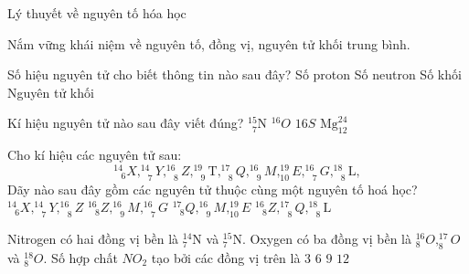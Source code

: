 \begin{dang}{Lý thuyết về nguyên tố hóa học}\end{dang}
\begin{pp}
	Nắm vững khái niệm về nguyên tố, đồng vị, nguyên tử khối trung bình.
\end{pp}
\begin{vdex}
	Số hiệu nguyên tử cho biết thông tin nào sau đây?
	\choice
	{\True Số proton}
	{Số neutron}
	{Số khối}
	{Nguyên tử khối}
\end{vdex}
\begin{vdex}
	Kí hiệu nguyên tử nào sau đây viết đúng?
	\choice
	{\True $_{\phantom{7}7}^{15}\mathrm{N}$}
	{$^{16}O$}
	{$16S$}
	{$\mathrm{Mg}_{12}^{24}$}
\end{vdex}
\begin{vdex}
	Cho kí hiệu các nguyên tử sau:
	$$
	_{\phantom{X}6}^{14}X,_{\phantom{X}7}^{14} Y,_{\phantom{X}8}^{16}Z,_{\phantom{X}9}^{19} \mathrm{T},_{\phantom{X}8}^{17}Q,_{\phantom{X}9}^{16} M,_{10}^{19} E,_{\phantom{X}7}^{16}G,_{\phantom{X}8}^{18}\mathrm{L},
	$$
	Dãy nào sau đây gồm các nguyên tử thuộc cùng một nguyên tố hoá học?
	\choice
	{$_{\phantom{X}6}^{14} X,_{\phantom{X}7}^{14} Y,_{\phantom{X}8}^{16} Z$}
	{$_{\phantom{X}8}^{16} Z,_{\phantom{X}9}^{16} M,_{\phantom{X}7}^{16} G$}
	{$_{\phantom{X}8}^{17} Q,_{\phantom{X}9}^{16} M,_{10}^{19} E$}
	{\True $_{\phantom{X}8}^{16} Z,_{\phantom{X}8}^{17} Q,_{\phantom{X}8}^{18}\mathrm{L}$}
\end{vdex}
\begin{vdex}
	Nitrogen có hai đồng vị bền là $_7^{14} \mathrm{N}$ và $_7^{15} \mathrm{N}$. Oxygen có ba đồng vị bền là $_8^{16} O,_8^{17} O$ và $_8^{18} O$. Số hợp chất $NO_2$ tạo bởi các đồng vị trên là
	\choice
	{$3$}
	{$6$}
	{$9$}
	{\True $12$}
\end{vdex}

